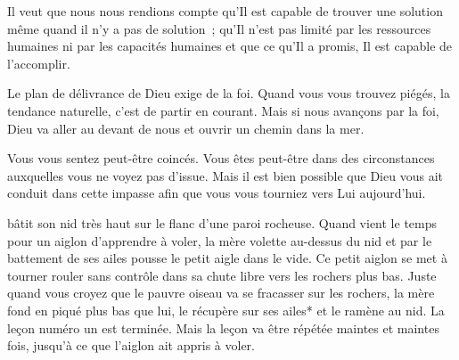 Il veut que nous nous rendions compte qu'Il est capable de trouver une solution
 même quand il n'y a pas de solution~;
 qu'Il n'est pas limité par les ressources humaines
 ni par les capacités humaines et que ce qu'Il a promis,
 Il est capable de l'accomplir.

Le plan de délivrance de Dieu exige de la foi.
 Quand vous vous trouvez piégés, la tendance naturelle,
 c'est de partir en courant.
 Mais si nous avançons par la foi,
 Dieu va aller au devant de nous et ouvrir un chemin dans la mer.

Vous vous sentez peut-être coincés.
 Vous êtes peut-être dans des circonstances
 auxquelles vous ne voyez pas d'issue.
 Mais il est bien possible que Dieu vous ait conduit dans cette impasse
 afin que vous vous tourniez vers Lui aujourd'hui. 

\dvrule






 bâtit son nid très haut
 sur le flanc d'une paroi rocheuse.
 Quand vient le temps pour un aiglon d'apprendre à voler,
 la mère volette au-dessus du nid et par le battement de ses ailes
 pousse le petit aigle dans le vide.
 Ce petit aiglon se met à tourner rouler sans contrôle
 dans sa chute libre vers les rochers plus bas.
 Juste quand vous croyez que le pauvre oiseau va se fracasser sur les rochers,
 la mère fond en piqué plus bas que lui, le récupère sur ses ailes*
 et le ramène au nid.
 La leçon numéro un est terminée.
 Mais la leçon va être répétée maintes et maintes fois,
 jusqu'à ce que l'aiglon ait appris à voler.

